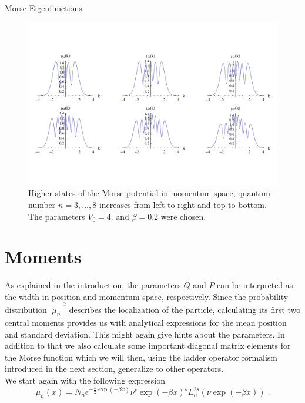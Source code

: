 \begin{chapter}{Morse Eigenfunctions}
\begin{figure}[h!]
\end{figure}


\begin{figure}[h!]
	\includegraphics[width=1.0\linewidth]{./figures/MorseFourier/FourierAbsn0_11.pdf}
       \caption[Morse momentum wavefunction for $n=3,\ldots,8$]{
	   Higher states of the Morse potential in momentum space, quantum number $n=3,\ldots,8$ increases from left to right and top to bottom.
	   The parameters $V_0=4.$ and $\beta=0.2$ were chosen.
	\label{fig:FourierAbsn0_11}
    }

\end{figure}



\section{Moments} %
\label{sec:Moments}
As explained in the introduction, the parameters $Q$ and $P$ can be interpreted as the width in position and momentum space, respectively.
Since the probability distribution $|\mu_n|^2$ describes the localization of the particle, calculating its first two central moments 
provides us with analytical expressions for the mean position and standard deviation. This might again give hints about the parameters.
In addition to that we also calculate some important diagonal matrix elements for the Morse function which we will then, using the ladder operator
formalism introduced in the next section, generalize to other operators.\\

We start again with the following expression
\begin{equation}
  \mu_{n}(x) = N_{n} e^{-\frac{\nu}{2} \exp(-\beta x)} \nu^{s} \exp(-\beta x)^{s} L_{n}^{2s}\left(\nu \exp(-\beta x)\right)\;.
\end{equation}



\end{chapter}
